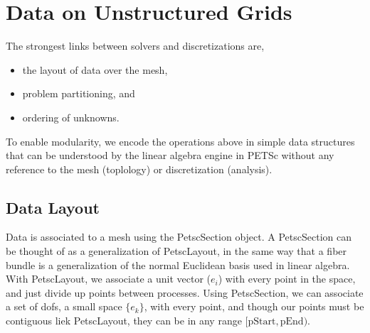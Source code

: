 {{{\section{Data on Unstructured Grids} 

The strongest links between solvers and discretizations are,
\begin{itemize}
  \item the layout of data over the mesh,
  \item problem partitioning, and
  \item ordering of unknowns.
\end{itemize}
To enable modularity, we encode the operations above in simple data structures that can be understood by the linear
algebra engine in PETSc without any reference to the mesh (toplology) or discretization (analysis).

\subsection{Data Layout}

Data is associated to a mesh using the PetscSection object. A PetscSection can be thought of as a generalization of
PetscLayout, in the same way that a fiber bundle is a generalization of the normal Euclidean basis used in linear
algebra. With PetscLayout, we associate a unit vector ($e_i$) with every point in the space, and just divide up points
between processes. Using PetscSection, we can associate a set of dofs, a small space $\{e_k\}$, with every point, and
though our points must be contiguous liek PetscLayout, they can be in any range $[\mathrm{pStart}, \mathrm{pEnd})$.

}}}
